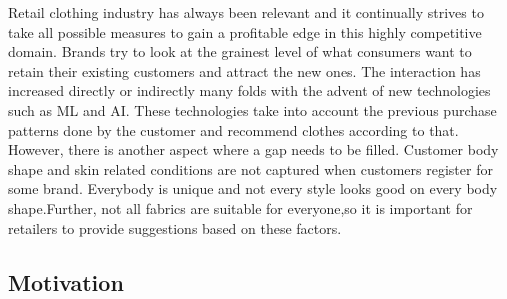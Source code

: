 \documentclass[11pt,journal,compsoc]{IEEEtran}
\begin{document}
\maketitle
\IEEEdisplaynontitleabstractindextext

Retail clothing industry has always been relevant and it continually strives to take all possible measures to gain a profitable edge in this highly competitive domain. Brands try to look at the grainest level of what consumers want to retain their existing customers and attract the new ones. The interaction has increased directly or indirectly many folds with the advent of new technologies such as ML and AI. These technologies take into account the previous purchase patterns done by the customer and recommend clothes according to that. However, there is another aspect where a gap needs to be filled. Customer body shape and skin related conditions are not captured when customers register for some brand. Everybody is unique and not every style looks good on every body shape.Further, not all fabrics are suitable for everyone,so it is important for retailers to provide suggestions based on these factors.
\subsection{Motivation}
\end{document}
